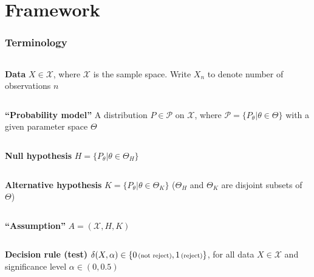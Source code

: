 \section{Framework}
\begin{frame}\frametitle{Terminology}
	\begin{columns}[t]
		\column{\margin}
		\column{\leftcol}
\textbf{Data}
		\column{\maincol}
		$X \in \mathcal{X}$, where $\mathcal{X}$ is the sample space. Write $X_n$ to denote number of observations $n$
		\column{\margin}
	\end{columns}
\myspacing
\begin{columns}[t]
	\column{\margin}
	\column{\leftcol}
	\textbf{``Probability model''}
	\column{\maincol}
	A distribution
	$P \in \mathcal{P}$ on $\mathcal{X}$, where $\mathcal{P} = \{P_\theta | \theta \in \Theta\}$ with a given parameter space $\Theta$
	\column{\margin}
\end{columns}
\myspacing\begin{columns}[t]
	\column{\margin}
	\column{\leftcol}
	\textbf{Null hypothesis}
	\column{\maincol}
	$H = \{P_\theta | \theta \in \Theta_H\}$
	\column{\margin}
\end{columns}
\myspacing\begin{columns}[t]
	\column{\margin}
	\column{\leftcol}
	\textbf{\small Alternative hypothesis}
	$K = \{P_\theta | \theta \in \Theta_K\}$
	\small
	($\Theta_H$ and $\Theta_K$ are \alert{disjoint subsets} of $\Theta$)
\end{columns}
\myspacing\begin{columns}[t]
	\column{\margin}
	\column{\leftcol}
	\textbf{``Assumption''}
	\column{\maincol}
	$A = (\mathcal{X}, H, K)$
	\column{\margin}
\end{columns}
\myspacing\begin{columns}[t]
	\column{\margin}
	\column{\leftcol}
	\textbf{Decision rule {\footnotesize (test)}}
	\column{\maincol}
	$\delta(X, \alpha) \in \{0 \text{\scriptsize\,(not reject)},1 \text{\scriptsize\,(reject)}\}$, for all data $X \in \mathcal{X}$ and \alert{significance level} $\alpha \in (0,0.5)$
	\column{\margin}
\end{columns}
\end{frame}


